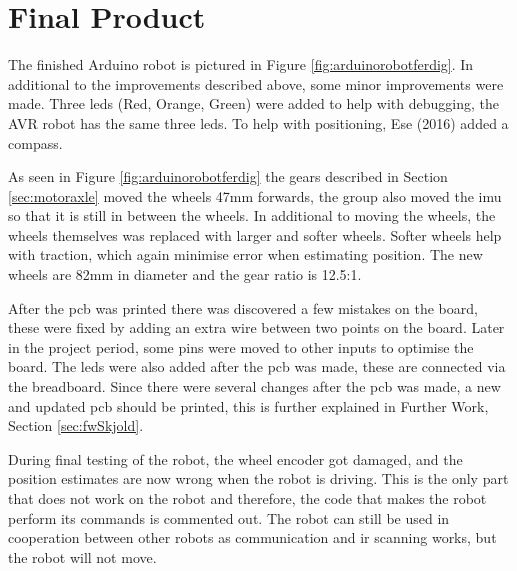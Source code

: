 \section{Final Product}
The finished Arduino robot is pictured in Figure \ref{fig:arduinorobotferdig}. In additional to the improvements described above, some minor improvements were made. Three \acrshort{led}s (Red, Orange, Green) were added to help with debugging, the AVR robot has the same three \acrshort{led}s. To help with positioning, Ese (2016) added a compass.

As seen in Figure \ref{fig:arduinorobotferdig} the gears described in Section \ref{sec:motoraxle} moved the wheels 47mm forwards, the group also moved the \acrshort{imu} so that it is still in between the wheels. In additional to moving the wheels, the wheels themselves was replaced with larger and softer wheels. Softer wheels help with traction, which again minimise error when estimating position. The new wheels are 82mm in diameter and the gear ratio is 12.5:1.

After the \acrshort{pcb} was printed there was discovered a few mistakes on the board, these were fixed by adding an extra wire between two points on the board. Later in the project period, some pins were moved to other inputs to optimise the board. The \acrshort{led}s were also added after the \acrshort{pcb} was made, these are connected via the breadboard. Since there were several changes after the \acrshort{pcb} was made, a new and updated \acrshort{pcb} should be printed, this is further explained in Further Work, Section \ref{sec:fwSkjold}.

During final testing of the robot, the wheel encoder got damaged, and the position estimates are now wrong when the robot is driving. This is the only part that does not work on the robot and therefore, the code that makes the robot perform its commands is commented out. The robot can still be used in cooperation between other robots as communication and \acrshort{ir} scanning works, but the robot will not move.
\vspace*{20pt}
